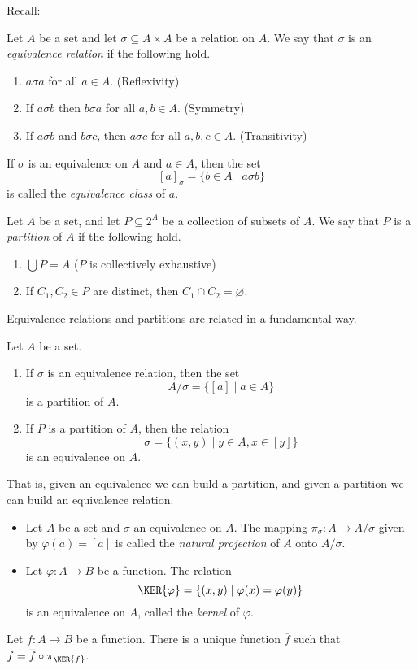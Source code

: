 \documentclass{article}
\begin{document}

Recall:

\begin{dfn}
Let $A$ be a set and let $\sigma \subseteq A \times A$ be a relation on $A$. We say that $\sigma$ is an \emph{equivalence relation} if the following hold.
\begin{enumerate}
\item $a \sigma a$ for all $a \in A$. (Reflexivity)
\item If $a \sigma b$ then $b \sigma a$ for all $a,b \in A$. (Symmetry)
\item If $a \sigma b$ and $b \sigma c$, then $a \sigma c$ for all $a,b,c \in A$. (Transitivity)
\end{enumerate}
If $\sigma$ is an equivalence on $A$ and $a \in A$, then the set \[ [a]_\sigma = \{ b \in A \mid a \sigma b \} \] is called the \emph{equivalence class} of $a$.
\end{dfn}

\begin{dfn}[Partition]
Let $A$ be a set, and let $P \subseteq 2^A$ be a collection of subsets of $A$. We say that $P$ is a \emph{partition} of $A$ if the following hold.
\begin{enumerate}
\item $\bigcup P = A$ ($P$ is collectively exhaustive)
\item If $C_1, C_2 \in P$ are distinct, then $C_1 \cap C_2 = \varnothing$.
\end{enumerate}
\end{dfn}

Equivalence relations and partitions are related in a fundamental way.

\begin{thm}
Let $A$ be a set.
\begin{enumerate}
\item If $\sigma$ is an equivalence relation, then the set \[ A/\sigma = \{ [a] \mid a \in A \} \] is a partition of $A$.
\item If $P$ is a partition of $A$, then the relation \[ \sigma = \{ (x,y) \mid y \in A, x \in [y] \} \] is an equivalence on $A$.
\end{enumerate}
\end{thm}

That is, given an equivalence we can build a partition, and given a partition we can build an equivalence relation.

\begin{dfn} \mbox{}
\begin{itemize}
\item Let $A$ be a set and $\sigma$ an equivalence on $A$. The mapping $\pi_\sigma : A \rightarrow A/\sigma$ given by $\varphi(a) = [a]$ is called the \emph{natural projection} of $A$ onto $A/\sigma$.
\item Let $\varphi : A \rightarrow B$ be a function. The relation \[ \KER{\varphi} = \{ (x,y) \mid \varphi(x) = \varphi(y) \} \] is an equivalence on $A$, called the \emph{kernel} of $\varphi$.
\end{itemize}
\end{dfn}

\begin{thm}
Let $f : A \rightarrow B$ be a function. There is a unique function $\overline{f}$ such that $f = \overline{f} \circ \pi_{\KER{f}}$.
\end{thm}
\end{document}
